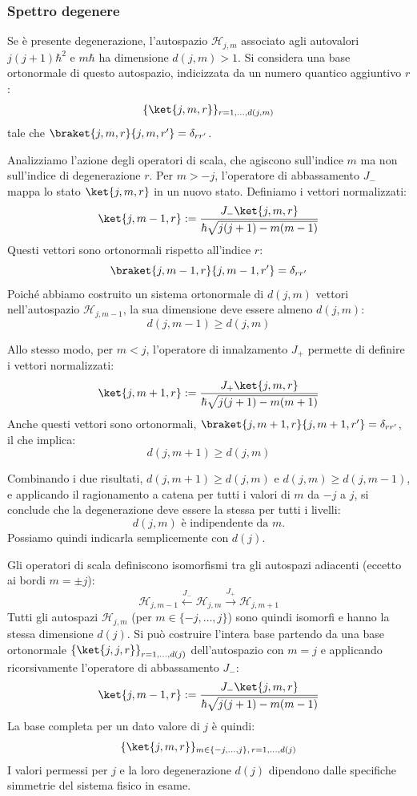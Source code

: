 \subsubsection{Spettro degenere}

Se è presente degenerazione, l'autospazio \(\mathcal{H}_{j,m}\) associato agli autovalori \(j(j+1)\hbar^2\) e \(m\hbar\) ha dimensione \(d(j,m) > 1\).
Si considera una base ortonormale di questo autospazio, indicizzata da un numero quantico aggiuntivo $r$:
\[
    \{ \ket{j, m, r} \}_{r=1, \dots, d(j,m)}
\]
tale che $\braket{j, m, r}{j, m, r'} = \delta_{rr'}$.

Analizziamo l'azione degli operatori di scala, che agiscono sull'indice $m$ ma non sull'indice di degenerazione $r$.
Per \(m > -j\), l'operatore di abbassamento \(J_-\) mappa lo stato \(\ket{j, m, r}\) in un nuovo stato. Definiamo i vettori normalizzati:
\[
    \ket{j, m-1, r} := \frac{J_- \ket{j, m, r}}{\hbar \sqrt{j(j+1) - m(m-1)}}
\]
Questi vettori sono ortonormali rispetto all'indice $r$:
\[
    \braket{j, m-1, r}{j, m-1, r'} = \delta_{rr'}
\]
Poiché abbiamo costruito un sistema ortonormale di \(d(j,m)\) vettori nell'autospazio \(\mathcal{H}_{j, m-1}\), la sua dimensione deve essere almeno \(d(j,m)\):
\[
    d(j, m-1) \ge d(j, m)
\]

Allo stesso modo, per \(m < j\), l'operatore di innalzamento \(J_+\) permette di definire i vettori normalizzati:
\[
    \ket{j, m+1, r} := \frac{J_+ \ket{j, m, r}}{\hbar \sqrt{j(j+1) - m(m+1)}}
\]
Anche questi vettori sono ortonormali, $\braket{j, m+1, r}{j, m+1, r'} = \delta_{rr'}$, il che implica:
\[
    d(j, m+1) \ge d(j, m)
\]

Combinando i due risultati, \(d(j, m+1) \ge d(j, m)\) e \(d(j, m) \ge d(j, m-1)\), e applicando il ragionamento a catena per tutti i valori di \(m\) da \(-j\) a \(j\), si conclude che la degenerazione deve essere la stessa per tutti i livelli:
\[
    d(j, m) \text{ è indipendente da } m.
\]
Possiamo quindi indicarla semplicemente con \(d(j)\).

Gli operatori di scala definiscono isomorfismi tra gli autospazi adiacenti (eccetto ai bordi \(m=\pm j\)):
\[
    \mathcal{H}_{j, m-1} \xleftarrow{J_-} \mathcal{H}_{j,m} \xrightarrow{J_+} \mathcal{H}_{j, m+1}
\]
Tutti gli autospazi \(\mathcal{H}_{j,m}\) (per \(m \in \{-j, \dots, j\}\)) sono quindi isomorfi e hanno la stessa dimensione \(d(j)\).
Si può costruire l'intera base partendo da una base ortonormale \(\left\{ \ket{j, j, r} \right\}_{r=1, \dots, d(j)}\) dell'autospazio con \(m=j\) e applicando ricorsivamente l'operatore di abbassamento \(J_-\):
\[
    \ket{j, m-1, r} := \frac{J_- \ket{j, m, r}}{\hbar \sqrt{j(j+1) - m(m-1)}}
\]
La base completa per un dato valore di \(j\) è quindi:
\[
    \{ \ket{j, m, r} \}_{m \in \{-j, \dots, j\}, \, r=1, \dots, d(j)}
\]
I valori permessi per \(j\) e la loro degenerazione \(d(j)\) dipendono dalle specifiche simmetrie del sistema fisico in esame.


